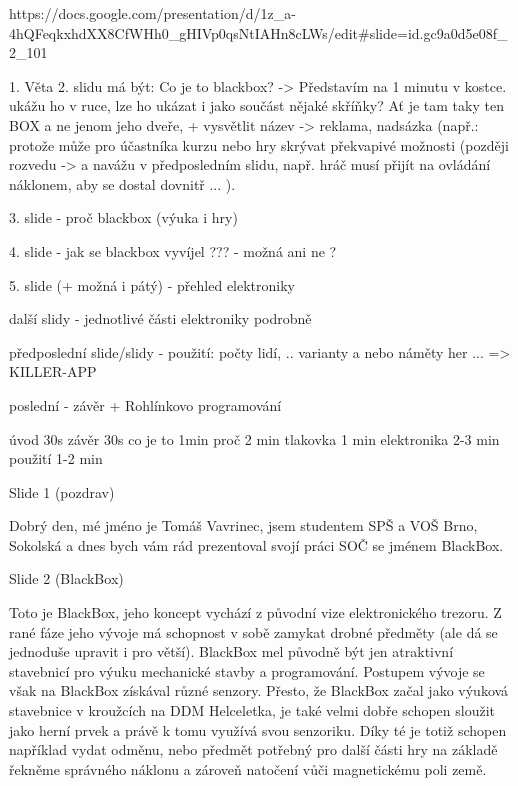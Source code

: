 https://docs.google.com/presentation/d/1z_a-4hQFeqkxhdXX8CfWHh0_gHIVp0qsNtIAHn8cLWs/edit#slide=id.gc9a0d5e08f_2_101

1. Věta 2. slidu má být: Co je to blackbox? -> Představím na 1 minutu v kostce.  
ukážu ho v ruce, lze ho ukázat i jako součást nějaké skříňky? Ať je tam taky ten BOX  
a ne jenom jeho dveře, 
+ vysvětlit název -> reklama, nadsázka (např.: protože může pro účastníka kurzu nebo 
hry skrývat překvapivé možnosti (později rozvedu -> a navážu v předposledním slidu, 
např. hráč musí přijít na ovládání náklonem, aby se dostal dovnitř ... ).


3. slide - proč blackbox (výuka i hry)

4. slide - jak se blackbox vyvíjel ??? - možná ani ne ? 

5. slide (+ možná i pátý) - přehled elektroniky 

další slidy - jednotlivé části elektroniky podrobně %


předposlední slide/slidy - použití: počty lidí, .. varianty a nebo náměty her ... => KILLER-APP

poslední - závěr + Rohlínkovo programování  

úvod 30s závěr 30s 
co je to 1min 
proč 2 min 
tlakovka 1 min 
elektronika 2-3 min 
použití 1-2 min 


Slide 1 (pozdrav)

Dobrý den, mé jméno je Tomáš Vavrinec, jsem studentem SPŠ a VOŠ Brno, Sokolská
a dnes bych vám rád prezentoval svojí práci SOČ se jménem BlackBox.



Slide 2 (BlackBox)

Toto je BlackBox, jeho koncept vychází z původní vize elektronického trezoru.
Z rané fáze jeho vývoje má schopnost v sobě zamykat drobné předměty (ale dá se jednoduše upravit i pro větší).
BlackBox mel původně být jen atraktivní stavebnicí pro výuku mechanické stavby a programování. 
Postupem vývoje se však na BlackBox získával různé senzory. 
Přesto, že BlackBox začal jako výuková stavebnice 
v kroužcích na DDM Helceletka, je také velmi dobře 
schopen sloužit jako herní prvek a právě k tomu využívá svou senzoriku. 
Díky té je totiž schopen například vydat odměnu, nebo
předmět potřebný pro další části hry na základě řekněme správného náklonu 
a zároveň natočení vůči magnetickému poli země.

